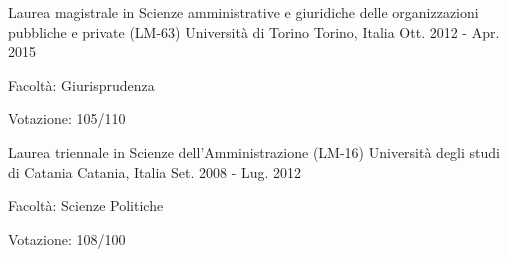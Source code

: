 


\begin{cventries}


\cventry
{Laurea magistrale in Scienze amministrative e giuridiche delle organizzazioni pubbliche e private (LM-63)} %
{Università di Torino} %
{Torino, Italia} %
{Ott. 2012 - Apr. 2015} %
{ %
	\begin{cvitems}
		\item {Facoltà: Giurisprudenza}
		\item {Votazione: 105/110}
	\end{cvitems}
}


\cventry
{Laurea triennale in Scienze dell'Amministrazione (LM-16)} %
{Università degli studi di Catania} %
{Catania, Italia} %
{Set. 2008 - Lug. 2012} %
{ %
	\begin{cvitems}
		\item {Facoltà: Scienze Politiche}
		\item {Votazione: 108/100}
	\end{cvitems}
}


\end{cventries}

\bigbreak

